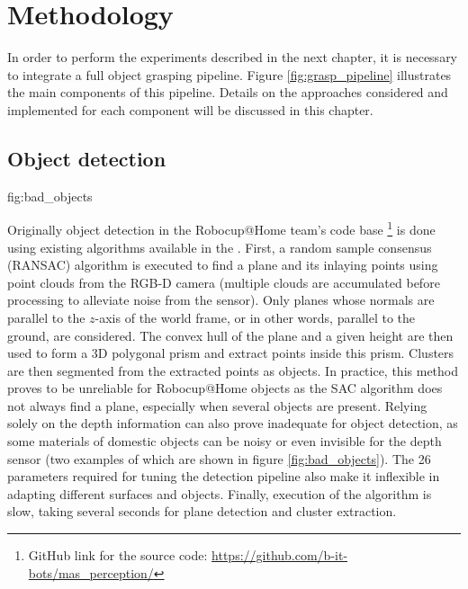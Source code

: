 \chapter{Methodology}


In order to perform the experiments described in the next chapter, it is necessary to integrate a full object grasping
pipeline. Figure \ref{fig:grasp_pipeline} illustrates the main components of this pipeline. Details on the approaches
considered and implemented for each component will be discussed in this chapter.


\section{Object detection}
             {fig:bad_objects}{\textwidth}

Originally object detection in the Robocup@Home team's code base \footnote{GitHub link for the source code:
\url{https://github.com/b-it-bots/mas\_perception/}} is done using existing algorithms available in the
. First, a random sample consensus (RANSAC)
algorithm is executed to find a plane and its inlaying points using point clouds from the RGB-D camera (multiple clouds
are accumulated before processing to alleviate noise from the sensor). Only planes whose normals are parallel to the
$ z $-axis of the world frame, or in other words, parallel to the ground, are considered. The convex hull of the plane
and a given height are then used to form a 3D polygonal prism and extract points inside this prism. Clusters are then
segmented from the extracted points as objects. In practice, this method proves to be unreliable for Robocup@Home
objects as the SAC algorithm does not always find a plane, especially when several objects are present. Relying solely
on the depth information can also prove inadequate for object detection, as some materials of domestic objects can be
noisy or even invisible for the depth sensor (two examples of which are shown in figure \ref{fig:bad_objects}). The 26
parameters required for tuning the detection pipeline also make it inflexible in adapting different surfaces and
objects. Finally, execution of the algorithm is slow, taking several seconds for plane detection and cluster
extraction.

